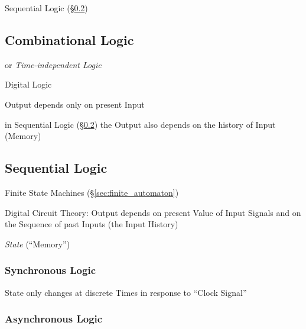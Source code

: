 Sequential Logic (\S\ref{sec:sequential_logic})




\subsection{Combinational Logic}\label{sec:combinational_logic}

or \emph{Time-independent Logic}

Digital Logic

Output depends only on present Input

in Sequential Logic (\S\ref{sec:sequential_logic}) the Output also
depends on the history of Input (Memory)




\subsection{Sequential Logic}\label{sec:sequential_logic}


Finite State Machines (\S\ref{sec:finite_automaton})

Digital Circuit Theory: Output depends on present Value of Input
Signals and on the Sequence of past Inputs (the Input History)

\emph{State} (``Memory'')



\subsubsection{Synchronous Logic}\label{sec:synchronous_logic}

State only changes at discrete Times in response to ``Clock Signal''



\subsubsection{Asynchronous Logic}\label{sec:asynchronous_logic}

